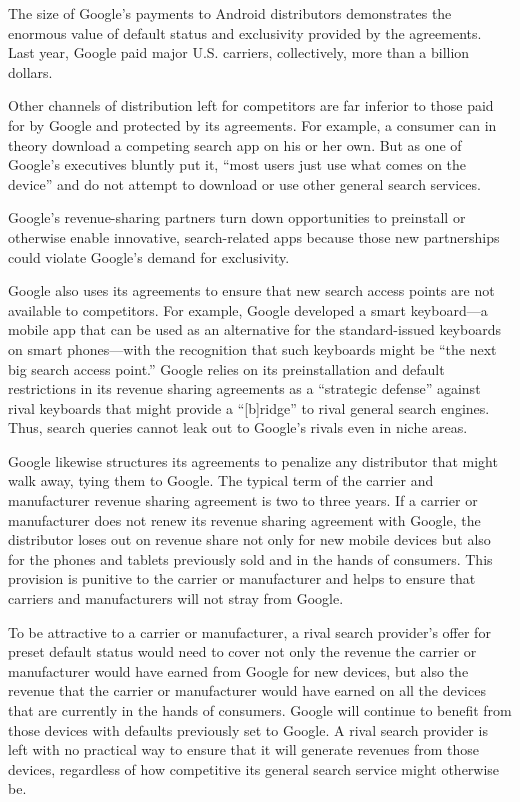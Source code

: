 \documentclass[11pt,b5paper]{scrartcl}
\begin{document}

The size of Google’s payments to Android distributors demonstrates the
enormous value of default status and exclusivity provided by the agreements. Last year, Google
paid major U.S. carriers, collectively, more than a billion dollars.


Other channels of distribution left for competitors are far inferior to those paid for
by Google and protected by its agreements. For example, a consumer can in theory download a
competing search app on his or her own. But as one of Google’s executives bluntly put it, “most
users just use what comes on the device” and do not attempt to download or use other general
search services.


Google’s revenue-sharing partners turn down opportunities to preinstall or
otherwise enable innovative, search-related apps because those new partnerships could violate
Google’s demand for exclusivity.


Google also uses its agreements to ensure that new search access points are not
available to competitors. For example, Google developed a smart keyboard—a mobile app that
can be used as an alternative for the standard-issued keyboards on smart phones—with the
recognition that such keyboards might be “the next big search access point.” Google relies on its
preinstallation and default restrictions in its revenue sharing agreements as a “strategic defense”
against rival keyboards that might provide a “[b]ridge” to rival general search engines. Thus,
search queries cannot leak out to Google’s rivals even in niche areas.


Google likewise structures its agreements to penalize any distributor that might
walk away, tying them to Google. The typical term of the carrier and manufacturer revenue
sharing agreement is two to three years. If a carrier or manufacturer does not renew its revenue
sharing agreement with Google, the distributor loses out on revenue share not only for new
mobile devices but also for the phones and tablets previously sold and in the hands of consumers.
This provision is punitive to the carrier or manufacturer and helps to ensure that carriers and
manufacturers will not stray from Google.


To be attractive to a carrier or manufacturer, a rival search provider’s offer for
preset default status would need to cover not only the revenue the carrier or manufacturer would
have earned from Google for new devices, but also the revenue that the carrier or manufacturer
would have earned on all the devices that are currently in the hands of consumers. Google will
continue to benefit from those devices with defaults previously set to Google. A rival search
provider is left with no practical way to ensure that it will generate revenues from those devices,
regardless of how competitive its general search service might otherwise be.
\end{document}
